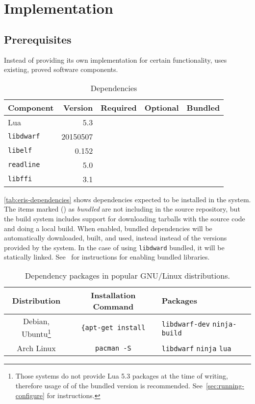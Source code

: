 
\chapter{Implementation}

\section{Prerequisites}

Instead of providing its own implementation for certain functionality, \Eris*
uses existing, proved software components.

\begin{table}[h]
	\centering
	\begin{tabular}{lrccc}
		\toprule
		Component & Version  & Required & Optional & Bundled \\
		\midrule
		Lua             & 5.3      & \Tick &       & \Tick \\
		\verb|libdwarf| & 20150507 & \Tick &       & \Tick \\
		\verb|libelf|   & 0.152    & \Tick &       & \\
		\verb|readline| & 5.0      &       & \Tick & \\
		\verb|libffi|   & 3.1      & \Tick &       & \\
		\bottomrule
	\end{tabular}
	\caption{Dependencies}
	\label{tab:eris-dependencies}
\end{table}

\autoref{tab:eris-dependencies} shows dependencies expected to be installed in
the system. The items marked (\inlinesymbol\Tick) as \emph{bundled} are not including in
the source repository, but the build system includes support for downloading
tarballs with the source code and doing a local build. When enabled, bundled
dependencies will be automatically downloaded, built, and used, instead
instead of the versions provided by the system. In the case of using
\verb|libdward| bundled, it will be statically linked.
See~ for instructions for enabling bundled
libraries.

\begin{table}
  \begin{tabular}{ccp{}}
  \toprule
	Distribution & Installation Command & Packages \\
	\midrule
	Debian, Ubuntu\footnote{Those systems do not provide Lua 5.3 packages
	at the time of writing, therefore usage of of the bundled version is
	recommended. See~\autoref{sec:running-configure} for instructions.} &
    \verb|{apt-get install| &
    \verb|libdwarf-dev| \verb|ninja-build| \\
	Arch Linux & \verb|pacman -S| & \verb|libdwarf| \verb|ninja| \verb|lua| \\
	\bottomrule
  \end{tabular}
  \caption{Dependency packages in popular GNU/Linux distributions.}
  \label{tab:distro-dependency-packages}
\end{table}

